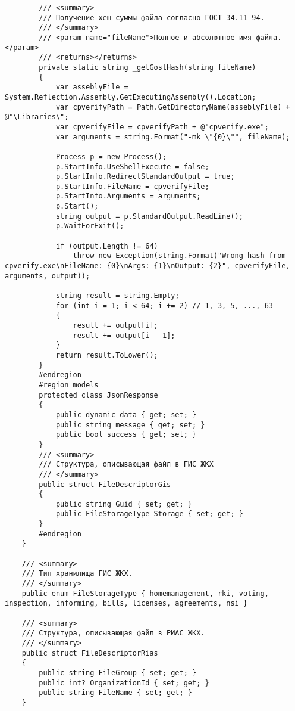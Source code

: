 \begin{lstlisting}
        /// <summary>
        /// Получение хеш-суммы файла согласно ГОСТ 34.11-94.
        /// </summary>
        /// <param name="fileName">Полное и абсолютное имя файла.</param>
        /// <returns></returns>
        private static string _getGostHash(string fileName)
        {
            var asseblyFile = System.Reflection.Assembly.GetExecutingAssembly().Location;
            var cpverifyPath = Path.GetDirectoryName(asseblyFile) + @"\Libraries\";
            var cpverifyFile = cpverifyPath + @"cpverify.exe";
            var arguments = string.Format("-mk \"{0}\"", fileName);

            Process p = new Process();
            p.StartInfo.UseShellExecute = false;
            p.StartInfo.RedirectStandardOutput = true;
            p.StartInfo.FileName = cpverifyFile;
            p.StartInfo.Arguments = arguments;
            p.Start();
            string output = p.StandardOutput.ReadLine();
            p.WaitForExit();

            if (output.Length != 64)
                throw new Exception(string.Format("Wrong hash from cpverify.exe\nFileName: {0}\nArgs: {1}\nOutput: {2}", cpverifyFile, arguments, output));

            string result = string.Empty;
            for (int i = 1; i < 64; i += 2) // 1, 3, 5, ..., 63
            {
                result += output[i];
                result += output[i - 1];
            }
            return result.ToLower();
        }
        #endregion
        #region models
        protected class JsonResponse
        {
            public dynamic data { get; set; }
            public string message { get; set; }
            public bool success { get; set; }
        }
        /// <summary>
        /// Структура, описывающая файл в ГИС ЖКХ
        /// </summary>
        public struct FileDescriptorGis
        {
            public string Guid { set; get; }
            public FileStorageType Storage { set; get; }
        }
        #endregion
    }

    /// <summary>
    /// Тип хранилища ГИС ЖКХ.
    /// </summary>
    public enum FileStorageType { homemanagement, rki, voting, inspection, informing, bills, licenses, agreements, nsi }

    /// <summary>
    /// Структура, описывающая файл в РИАС ЖКХ.
    /// </summary>
    public struct FileDescriptorRias
    {
        public string FileGroup { set; get; }
        public int? OrganizationId { set; get; }
        public string FileName { set; get; }
    }


\end{lstlisting}
